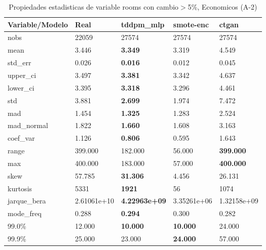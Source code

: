 \begin{table}[H]
\centering
\fontsize{8}{14}\selectfont
\caption{Propiedades estadisticas de variable rooms con cambio\ensuremath{>}5\%, Economicos (A-2)}
\label{table-stats-economicos-a-2-rooms-short}
\begin{tabular}{|l|m{10em}|m{10em}|m{10em}|m{10em}|}
\hline
 \rowcolor[gray]{0.8}
Variable/Modelo & Real & tddpm\_mlp & smote-enc & ctgan \\
\hline nobs & 22059 & 27574 & 27574 & 27574 \\
\hline mean & 3.446 & \bfseries 3.349 & 3.319 & \cellcolor[rgb]{0.9, 0.54, 0.52} 4.549 \\
\hline std\_err & 0.026 & \bfseries 0.016 & 0.012 & \cellcolor[rgb]{0.9, 0.54, 0.52} 0.045 \\
\hline upper\_ci & 3.497 & \bfseries 3.381 & 3.342 & \cellcolor[rgb]{0.9, 0.54, 0.52} 4.637 \\
\hline lower\_ci & 3.395 & \bfseries 3.318 & 3.296 & \cellcolor[rgb]{0.9, 0.54, 0.52} 4.461 \\
\hline std & 3.881 & \bfseries 2.699 & 1.974 & \cellcolor[rgb]{0.9, 0.54, 0.52} 7.472 \\
\hline mad & 1.454 & \bfseries 1.325 & 1.283 & \cellcolor[rgb]{0.9, 0.54, 0.52} 2.524 \\
\hline mad\_normal & 1.822 & \bfseries 1.660 & 1.608 & \cellcolor[rgb]{0.9, 0.54, 0.52} 3.163 \\
\hline coef\_var & 1.126 & \bfseries 0.806 & \cellcolor[rgb]{0.9, 0.54, 0.52} 0.595 & 1.643 \\
\hline range & 399.000 & 182.000 & \cellcolor[rgb]{0.9, 0.54, 0.52} 56.000 & \bfseries 399.000 \\
\hline max & 400.000 & 183.000 & \cellcolor[rgb]{0.9, 0.54, 0.52} 57.000 & \bfseries 400.000 \\
\hline skew & 57.785 & \bfseries 31.306 & \cellcolor[rgb]{0.9, 0.54, 0.52} 4.456 & 26.131 \\
\hline kurtosis & 5331 & \bfseries 1921 & \cellcolor[rgb]{0.9, 0.54, 0.52} 56 & 1074 \\
\hline jarque\_bera & 2.61061e+10 & \bfseries 4.22963e+09 & \cellcolor[rgb]{0.9, 0.54, 0.52} 3.35261e+06 & 1.32158e+09 \\
\hline mode\_freq & 0.288 & \bfseries 0.294 & \cellcolor[rgb]{0.9, 0.54, 0.52} 0.300 & 0.282 \\
\hline 99.0\% & 12.000 & \bfseries 10.000 & \bfseries 10.000 & \cellcolor[rgb]{0.9, 0.54, 0.52} 24.000 \\
\hline 99.9\% & 25.000 & 23.000 & \bfseries 24.000 & \cellcolor[rgb]{0.9, 0.54, 0.52} 57.000 \\
\hline
\end{tabular}
\end{table}
